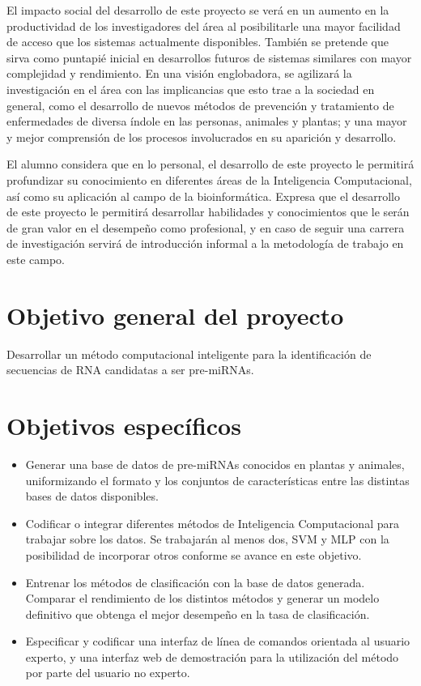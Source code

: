 \documentclass[12pt,bibliography=oldstyle,DIV=14,parskip=full-,titlepage]{scrartcl}
\begin{document}
El impacto social del desarrollo de este proyecto se verá en un
aumento en la productividad de los investigadores del área al
posibilitarle una mayor facilidad de acceso que los sistemas actualmente
disponibles. También se pretende que sirva como puntapié inicial en
desarrollos futuros de sistemas similares con mayor complejidad y
rendimiento. En una visión englobadora, se agilizará la investigación
en el área con las implicancias que esto trae a la sociedad en
general, como el desarrollo de nuevos métodos de prevención y
tratamiento de enfermedades de diversa índole en las personas,
animales y plantas; y una mayor y mejor comprensión de los procesos
involucrados en su aparición y desarrollo.

El alumno considera que en lo personal, el desarrollo de este proyecto
le permitirá profundizar su conocimiento en diferentes áreas de la
Inteligencia Computacional, así como su aplicación al campo de la
bioinformática. Expresa que el desarrollo de este proyecto le
permitirá desarrollar habilidades y conocimientos que le serán de gran
valor en el desempeño como profesional, y en caso de seguir una
carrera de investigación servirá de introducción informal a la
metodología de trabajo en este campo.
%
%
\section{Objetivo general del proyecto}
Desarrollar un método computacional inteligente para la identificación
de secuencias de RNA candidatas a ser pre-miRNAs.
\section{Objetivos específicos}
\begin{itemize}
\item Generar una base de datos de pre-miRNAs conocidos en plantas y
  animales, uniformizando el formato y los conjuntos de
  características entre las distintas bases de datos disponibles.
\item Codificar o integrar diferentes métodos de Inteligencia
  Computacional para trabajar sobre los datos. Se trabajarán al menos
  dos, SVM y MLP con la posibilidad de incorporar otros conforme se
  avance en este objetivo.
\item Entrenar los métodos de clasificación con la base de datos
  generada. Comparar el rendimiento de los distintos métodos y generar
  un modelo definitivo que obtenga el mejor desempeño en la tasa de
  clasificación.
\item Especificar y codificar una interfaz de línea de comandos
  orientada al usuario experto, y una interfaz web de demostración
  para la utilización del método por parte del usuario no experto.
\end{itemize}
%
%
\end{document}
